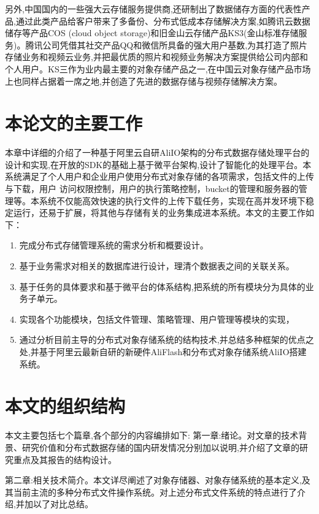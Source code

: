 另外,中国国内的一些强大云存储服务提供商,还研制出了数据储存方面的代表性产品,通过此类产品给客户带来了多备份、分布式低成本存储解决方案,如腾讯云数据储存等产品COS (cloud object storage)和旧金山云存储产品KS3(金山标准存储服务)。腾讯公司凭借其社交产品QQ和微信所具备的强大用户基数,为其打造了照片存储业务和视频云业务,并把最优质的照片和视频业务解决方案提供给公司内部和个人用户。KS三作为业内最主要的对象存储产品之一,在中国云对象存储产品市场上也同样占据着一席之地,并创造了先进的数据存储与视频存储解决方案。

\section{本论文的主要工作}
本章中详细的介绍了一种基于阿里云自研AliIO架构的分布式数据存储处理平台的设计和实现,在开放的SDK的基础上基于微平台架构,设计了智能化的处理平台。本系统满足了个人用户和企业用户使用分布式对象存储的各项需求，包括文件的上传与下载，用户
访问权限控制，用户的执行策略控制，bucket的管理和服务器的管理等。本系统不仅能高效快速的执行文件的上传下载任务，实现在高并发环境下稳定运行，还易于扩展，将其他与存储有关的业务集成进本系统。本文的主要工作如下：

\begin{enumerate}
    \item 完成分布式存储管理系统的需求分析和概要设计。
    \item 基于业务需求对相关的数据库进行设计，理清个数据表之间的关联关系。
    \item 基于任务的具体要求和基于微平台的体系结构,把系统的所有模块分为具体的业务子单元。
    \item 实现各个功能模块，包括文件管理、策略管理、用户管理等模块的实现，
    \item 通过分析目前主导的分布式对象存储系统的结构技术,并总结多种框架的优点之
    处,并基于阿里云最新自研的新硬件AliFlash和分布式对象存储系统AliIO搭建系统。
\end{enumerate}



\section{本文的组织结构}

本文主要包括七个篇章,各个部分的内容编排如下:
第一章:绪论。对文章的技术背景、研究价值和分布式数据存储的国内研发情况分别加以说明,并介绍了文章的研究重点及其报告的结构设计。

第二章:相关技术简介。本文详尽阐述了对象存储器、对象存储系统的基本定义,及其当前主流的多种分布式文件操作系统。对上述分布式文件系统的特点进行了介绍,并加以了对比总结。

